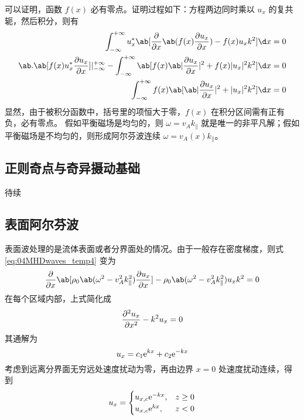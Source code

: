 可以证明，函数 $f(x)$ 必有零点。证明过程如下：方程两边同时乘以 $u_x$ 的复共轭，然后积分，则有
\begin{equation}\begin{aligned}
\int_{-\infty}^{+\infty} u_x^* \ab[
    \pdv{}{x} \ab( f(x) \pdv{u_x}{x} )
    - f(x) u_x k^2
] \d x &=0 \\
\ab.\ab[ f(x) u_x^* \pdv{u_x}{x} ]|_{-\infty}^{+\infty}
- \int_{-\infty}^{+\infty} \ab[
    f(x) \ab| \pdv{u_x}{x} |^2
    + f(x) |u_x|^2 k^2
] \d x &= 0 \\
\int_{-\infty}^{+\infty}
    f(x) \ab[ \ab| \pdv{u_x}{x} |^2
    + |u_x|^2 k^2 ]
\d x &= 0
\end{aligned}\end{equation}
显然，由于被积分函数中，括号里的项恒大于零，$f(x)$ 在积分区间需有正有负，必有零点。
假如平衡磁场是均匀的，则 $\omega = v_A k_\parallel$ 就是唯一的非平凡解；假如平衡磁场是不均匀的，则形成阿尔芬波连续 $\omega = v_A(x) k_\parallel$。

\subsection{正则奇点与奇异摄动基础}

待续

\subsection{表面阿尔芬波}

表面波处理的是流体表面或者分界面处的情况。由于一般存在密度梯度，则式 \ref{eq:04MHDwaves_temp4} 变为
\begin{equation}
\pdv{}{x} \ab[ \rho_0 \ab( \omega^2 - v_A^2 k_\parallel^2 ) \pdv{u_x}{x} ]
- \rho_0 \ab( \omega^2 - v_A^2 k_\parallel^2 ) u_x k^2
= 0
\end{equation}
在每个区域内部，上式简化成
\begin{equation}
\pdv[2]{u_x}{x} - k^2 u_x = 0
\end{equation}
其通解为
\begin{equation}
u_x = c_1 \mathrm{e}^{k x} + c_2 \mathrm{e}^{- k x}
\end{equation}
考虑到远离分界面无穷远处速度扰动为零，再由边界 $x = 0$ 处速度扰动连续，得到
\begin{equation}
u_x = \begin{cases}
    u_{x,c} \mathrm{e}^{- k x}, & z \geq 0 \\
    u_{x,c} \mathrm{e}^{k x}  , & z < 0 \\
\end{cases}
\end{equation}

